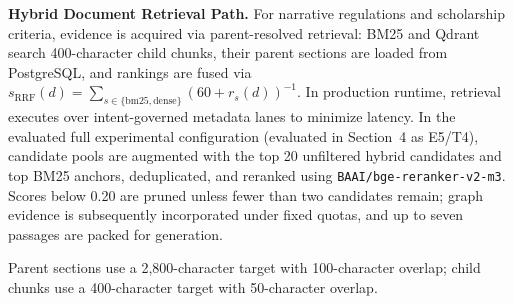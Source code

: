 \textbf{Hybrid Document Retrieval Path.}
For narrative regulations and scholarship criteria, evidence is acquired via parent-resolved retrieval: BM25 and Qdrant search 400-character child chunks, their parent sections are loaded from PostgreSQL, and rankings are fused via $s_{\mathrm{RRF}}(d)=\sum_{s\in\{\mathrm{bm25},\mathrm{dense}\}}(60+r_s(d))^{-1}$. In production runtime, retrieval executes over intent-governed metadata lanes to minimize latency. In the evaluated full experimental configuration (evaluated in Section~4 as E5/T4), candidate pools are augmented with the top 20 unfiltered hybrid candidates and top BM25 anchors, deduplicated, and reranked using \texttt{BAAI/bge-reranker-v2-m3}. Scores below 0.20 are pruned unless fewer than two candidates remain; graph evidence is subsequently incorporated under fixed quotas, and up to seven passages are packed for generation.

Parent sections use a 2,800-character target with 100-character overlap;
child chunks use a 400-character target with 50-character overlap.
